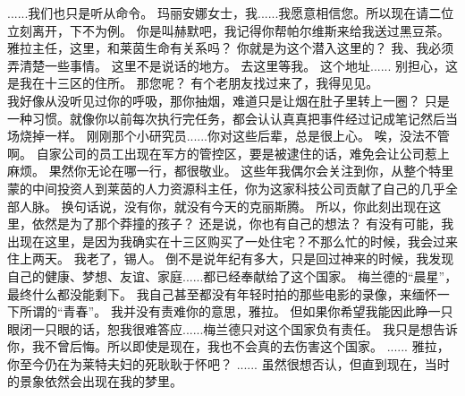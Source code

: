 \documentclass[openany]{book}
\begin{document}
\begin{dialogue}
     ......我们也只是听从命令。
     玛丽安娜女士，我......我愿意相信您。所以现在请二位立刻离开，下不为例。
     你是叫赫默吧，我记得你帮帕尔维斯来给我送过黑豆茶。
     雅拉主任，这里，和莱茵生命有关系吗？
     你就是为这个潜入这里的？
     我、我必须弄清楚一些事情。
     这里不是说话的地方。
     去这里等我。
     这个地址......
     别担心，这是我在十三区的住所。
     那您呢？
     有个老朋友找过来了，我得见见。
    \\
     我好像从没听见过你的呼吸，那你抽烟，难道只是让烟在肚子里转上一圈？
     只是一种习惯。就像你以前每次执行完任务，都会认认真真把事件经过记成笔记然后当场烧掉一样。
     刚刚那个小研究员......你对这些后辈，总是很上心。
     唉，没法不管啊。
     自家公司的员工出现在军方的管控区，要是被逮住的话，难免会让公司惹上麻烦。
     果然你无论在哪一行，都很敬业。
     这些年我偶尔会关注到你，从整个特里蒙的中间投资人到莱茵的人力资源科主任，你为这家科技公司贡献了自己的几乎全部人脉。
     换句话说，没有你，就没有今天的克丽斯腾。
     所以，你此刻出现在这里，依然是为了那个莽撞的孩子？
     还是说，你也有自己的想法？
     有没有可能，我出现在这里，是因为我确实在十三区购买了一处住宅？不那么忙的时候，我会过来住上两天。
     我老了，锡人。
     倒不是说年纪有多大，只是回过神来的时候，我发现自己的健康、梦想、友谊、家庭......都已经奉献给了这个国家。
     梅兰德的“晨星”，最终什么都没能剩下。
     我自己甚至都没有年轻时拍的那些电影的录像，来缅怀一下所谓的“青春”。
     我并没有责难你的意思，雅拉。
     但如果你希望我能因此睁一只眼闭一只眼的话，恕我很难答应......梅兰德只对这个国家负有责任。
     我只是想告诉你，我不曾后悔。所以即使是现在，我也不会真的去伤害这个国家。
     ......
     雅拉，你至今仍在为莱特夫妇的死耿耿于怀吧？
     ......
     虽然很想否认，但直到现在，当时的景象依然会出现在我的梦里。
\end{dialogue}
\end{document}
